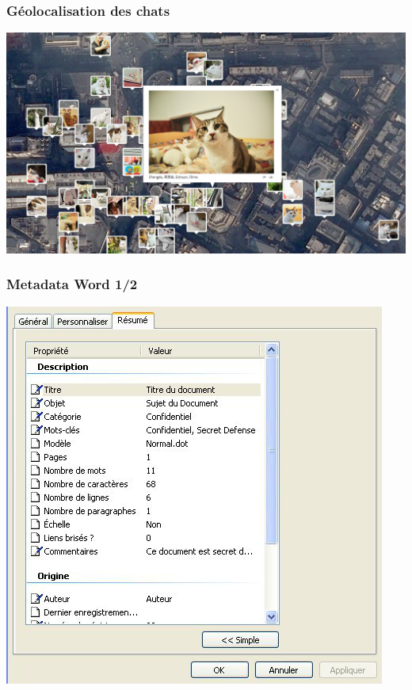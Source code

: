 \documentclass{beamer}
\begin{document}
\begin{frame}
\frametitle{Géolocalisation des chats}
\begin{center}
\includegraphics[scale=0.3] {./images/Chat_geolocalisaion.png}
\end{center}
\end{frame}

\begin{frame}
\frametitle{Metadata Word 1/2}
\begin{center}
\includegraphics[scale=0.5] {./images/Word01.jpg} 
\end{center}
\end{frame}
\end{document}
